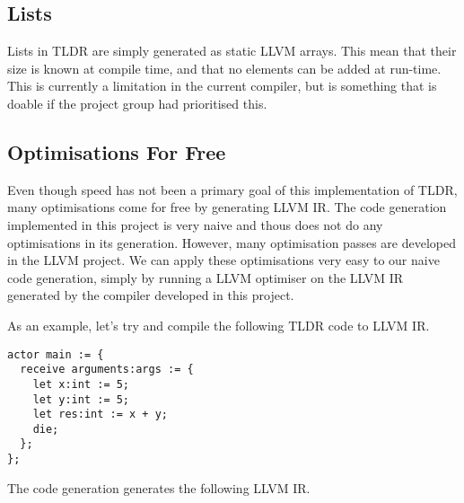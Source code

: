 \subsection{Lists}

Lists in TLDR are simply generated as static LLVM arrays. This mean that their size is known at compile time, and that no elements can be added at run-time. This is currently a limitation in the current compiler, but is something that is doable if the project group had prioritised this.

\subsection{Optimisations For Free}

Even though speed has not been a primary goal of this implementation of TLDR, many optimisations come for free by generating LLVM IR. The code generation implemented in this project is very naive and thous does not do any optimisations in its generation. However, many optimisation passes are developed in the LLVM project. We can apply these optimisations very easy to our naive code generation, simply by running a LLVM optimiser on the LLVM IR generated by the compiler developed in this project.

As an example, let's try and compile the following TLDR code to LLVM IR.

\begin{verbatim}
actor main := {
  receive arguments:args := {
    let x:int := 5;
    let y:int := 5;
    let res:int := x + y;
    die;
  };
};
\end{verbatim}

The code generation generates the following LLVM IR.

